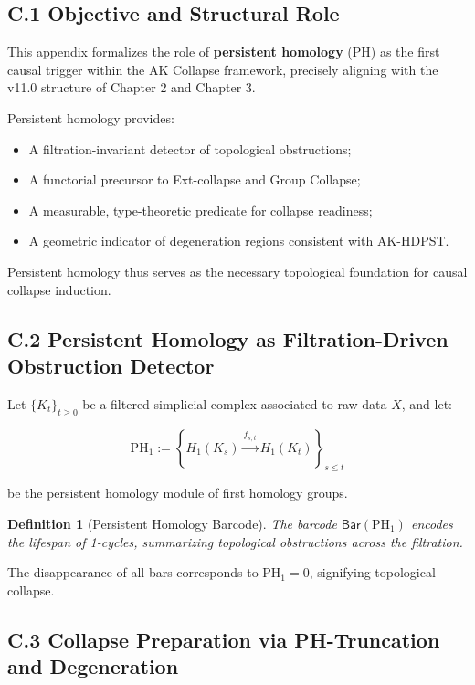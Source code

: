 \documentclass[11pt]{article}
\newtheorem{definition}[theorem]{Definition}
\begin{document}
\subsection*{C.1 Objective and Structural Role}

This appendix formalizes the role of \textbf{persistent homology} (PH) as the first causal trigger within the AK Collapse framework, precisely aligning with the v11.0 structure of Chapter 2 and Chapter 3.

Persistent homology provides:

\begin{itemize}
    \item A filtration-invariant detector of topological obstructions;
    \item A functorial precursor to Ext-collapse and Group Collapse;
    \item A measurable, type-theoretic predicate for collapse readiness;
    \item A geometric indicator of degeneration regions consistent with AK-HDPST.
\end{itemize}

Persistent homology thus serves as the necessary topological foundation for causal collapse induction.

\subsection*{C.2 Persistent Homology as Filtration-Driven Obstruction Detector}

Let \( \{ K_t \}_{t \geq 0} \) be a filtered simplicial complex associated to raw data \( X \), and let:

\[
\mathrm{PH}_1 := \left\{ H_1(K_s) \xrightarrow{f_{s,t}} H_1(K_t) \right\}_{s \leq t}
\]

be the persistent homology module of first homology groups.

\begin{definition}[Persistent Homology Barcode]
The barcode \( \mathsf{Bar}(\mathrm{PH}_1) \) encodes the lifespan of 1-cycles, summarizing topological obstructions across the filtration.
\end{definition}

The disappearance of all bars corresponds to \( \mathrm{PH}_1 = 0 \), signifying topological collapse.

\subsection*{C.3 Collapse Preparation via PH-Truncation and Degeneration}
\end{document}

